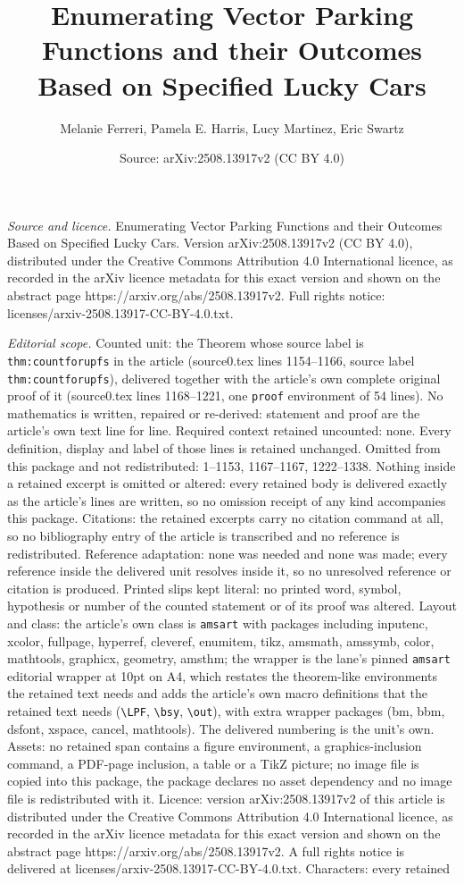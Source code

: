 \documentclass[10pt,a4paper]{amsart}
\title[Enumerating Vector Parking Functions and their Outcomes Base]{Enumerating Vector Parking Functions and their Outcomes Based on Specified Lucky Cars}
\author{Melanie Ferreri, Pamela E. Harris, Lucy Martinez, Eric Swartz}
\date{Source: arXiv:2508.13917v2 (CC BY 4.0)}
\begin{document}
\maketitle

\noindent\emph{Source and licence.} Enumerating Vector Parking Functions and their Outcomes Based on Specified Lucky Cars. Version arXiv:2508.13917v2 (CC BY 4.0), distributed under the Creative Commons Attribution 4.0 International licence, as recorded in the arXiv licence metadata for this exact version and shown on the abstract page https://arxiv.org/abs/2508.13917v2. Full rights notice: licenses/arxiv-2508.13917-CC-BY-4.0.txt.\par\smallskip

\noindent\textit{Editorial scope.} Counted unit: the Theorem whose source label is \texttt{thm:countforupfs} in the article (source0.tex lines 1154--1166, source label \texttt{thm:countforupfs}), delivered together with the article's own complete original proof of it (source0.tex lines 1168--1221, one \texttt{proof} environment of 54 lines). No mathematics is written, repaired or re-derived: statement and proof are the article's own text line for line. Required context retained uncounted: none. Every definition, display and label of those lines is retained unchanged. Omitted from this package and not redistributed: 1--1153, 1167--1167, 1222--1338. Nothing inside a retained excerpt is omitted or altered: every retained body is delivered exactly as the article's lines are written, so no omission receipt of any kind accompanies this package. Citations: the retained excerpts carry no citation command at all, so no bibliography entry of the article is transcribed and no reference is redistributed. Reference adaptation: none was needed and none was made; every reference inside the delivered unit resolves inside it, so no unresolved reference or citation is produced. Printed slips kept literal: no printed word, symbol, hypothesis or number of the counted statement or of its proof was altered. Layout and class: the article's own class is \texttt{amsart} with packages including inputenc, xcolor, fullpage, hyperref, cleveref, enumitem, tikz, amsmath, amssymb, color, mathtools, graphicx, geometry, amsthm; the wrapper is the lane's pinned \texttt{amsart} editorial wrapper at 10pt on A4, which restates the theorem-like environments the retained text needs and adds the article's own macro definitions that the retained text needs (\texttt{\textbackslash LPF}, \texttt{\textbackslash bsy}, \texttt{\textbackslash out}), with extra wrapper packages (bm, bbm, dsfont, xspace, cancel, mathtools). The delivered numbering is the unit's own. Assets: no retained span contains a figure environment, a graphics-inclusion command, a PDF-page inclusion, a table or a TikZ picture; no image file is copied into this package, the package declares no asset dependency and no image file is redistributed with it. Licence: version arXiv:2508.13917v2 of this article is distributed under the Creative Commons Attribution 4.0 International licence, as recorded in the arXiv licence metadata for this exact version and shown on the abstract page https://arxiv.org/abs/2508.13917v2. A full rights notice is delivered at licenses/arxiv-2508.13917-CC-BY-4.0.txt. Characters: every retained 
\end{document}
